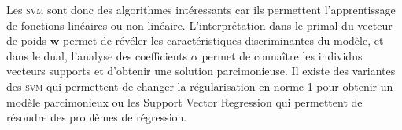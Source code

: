 Les \textsc{svm} sont donc des algorithmes intéressants car ils permettent l'apprentissage de fonctions linéaires ou non-linéaire. L'interprétation dans le primal du vecteur de poids $\textbf{w}$ permet de révéler les caractéristiques discriminantes du modèle, et dans le dual, l'analyse des coefficients $\alpha$ permet de connaître les individus vecteurs supports et d'obtenir une solution parcimonieuse. Il existe des variantes des \textsc{svm} qui permettent de changer la régularisation en norme 1 pour obtenir un modèle parcimonieux ou les Support Vector Regression qui permettent de résoudre des problèmes de régression.